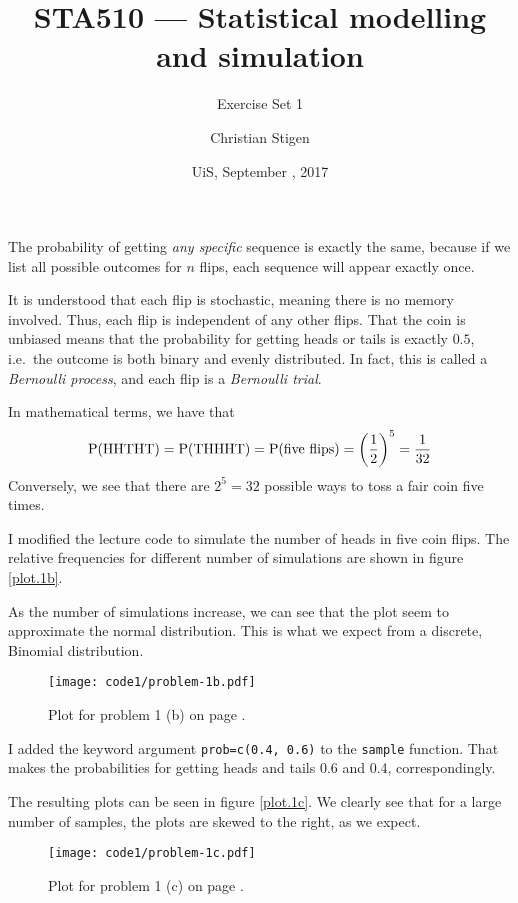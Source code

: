 \documentclass[a4paper,english,12pt]{article}
\title{STA510 --- Statistical modelling and simulation}
\subtitle{Exercise Set 1}
\author{Christian Stigen}
\date{UiS, September \nth{21}, 2017}
\begin{document}
\maketitle

The probability of getting \textit{any specific} sequence is exactly the same,
because if we list all possible outcomes for $n$ flips, each sequence will
appear exactly once.

It is understood that each flip is stochastic, meaning there is no memory
involved. Thus, each flip is independent of any other flips. That the coin is
unbiased means that the probability for getting heads or tails is exactly
$0.5$, i.e.~the outcome is both binary and evenly distributed. In fact, this is
called a \textit{Bernoulli process}, and each flip is a \textit{Bernoulli
trial}.

In mathematical terms, we have that
\begin{align*}
  \mathrm{P}(\textrm{HHTHT}) = \mathrm{P}(\textrm{THHHT}) = \mathrm{P}(\textrm{five flips}) =
    \left(\frac{1}{2}\right)^5 = \frac{1}{32}
\end{align*}
Conversely, we see that there are $2^5 = 32$ possible ways to toss a fair coin
five times.

I modified the lecture code to simulate the number of heads in five coin flips.
The relative frequencies for different number of simulations are shown in
figure \vref{plot.1b}.

As the number of simulations increase, we can see that the plot seem to
approximate the normal distribution. This is what we expect from a discrete,
Binomial distribution.
\begin{figure}[H]
  \texttt{[image: code1/problem-1b.pdf]}
  \caption{Plot for problem 1 (b) on page \pageref{problem.1 (b)}.}
  \label{plot.1b}
\end{figure}

I added the keyword argument \texttt{prob=c(0.4, 0.6)} to the \texttt{sample}
function. That makes the probabilities for getting heads and tails 0.6 and 0.4,
correspondingly.

The resulting plots can be seen in figure \vref{plot.1c}. We clearly see that
for a large number of samples, the plots are skewed to the right, as we expect.
\begin{figure}[H]
  \texttt{[image: code1/problem-1c.pdf]}
  \caption{Plot for problem 1 (c) on page \pageref{problem.1 (c)}.}
  \label{plot.1c}
\end{figure}
\end{document}
